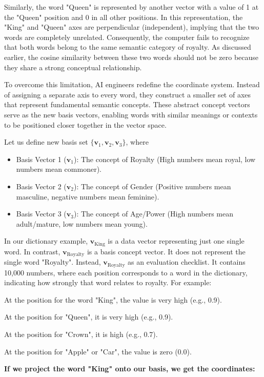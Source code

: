 \documentclass[DIV=20,oneside]{scrartcl}
\begin{document}
Similarly, the word "Queen" is represented by another vector with a value of 1 at the "Queen" position and 0 in all other positions. In this representation, the "King" and "Queen" axes are perpendicular (independent), implying that the two words are completely unrelated. Consequently, the computer fails to recognize that both words belong to the same semantic category of royalty. As discussed earlier, the cosine similarity between these two words should not be zero because they share a strong conceptual relationship.

To overcome this limitation, AI engineers redefine the coordinate system. Instead of assigning a separate axis to every word, they construct a smaller set of axes that represent fundamental semantic concepts. These abstract concept vectors serve as the new basis vectors, enabling words with similar meanings or contexts to be positioned closer together in the vector space.

Let us define new basis set $\{\textbf{v}_1,\textbf{v}_2,\textbf{v}_3\}$, where
\begin{itemize}
	\item Basis Vector 1 ($\mathbf{v}_1$): The concept of Royalty (High numbers mean royal, low numbers mean commoner).
	\item Basis Vector 2 ($\mathbf{v}_2$): The concept of Gender (Positive numbers mean masculine, negative numbers mean feminine).
	\item Basis Vector 3 ($\mathbf{v}_3$): The concept of Age/Power (High numbers mean adult/mature, low numbers mean young).
\end{itemize}
In our dictionary example, $\mathbf{v}_{\text{King}}$ is a data vector representing just one single word. In contrast, $\mathbf{v}_{\text{Royalty}}$ is a basis concept vector. It does not represent the single word "Royalty". Instead, $\mathbf{v}_{\text{Royalty}}$ as an evaluation checklist. It contains 10,000 numbers, where each position corresponds to a word in the dictionary, indicating how strongly that word relates to royalty. For example:

At the position for the word "King", the value is very high (e.g., 0.9).

At the position for "Queen", it is very high (e.g., 0.9).

At the position for "Crown", it is high (e.g., 0.7).

At the position for "Apple" or "Car", the value is zero (0.0).

\textbf{If we project the word "King" onto our basis, we get the coordinates:}
\end{document}
